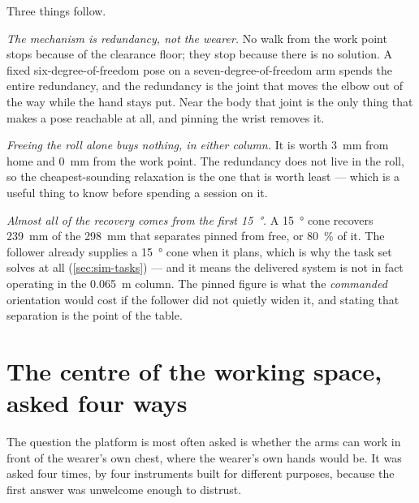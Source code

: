 Three things follow.

\emph{The mechanism is redundancy, not the wearer.} No walk from the work
point stops because of the clearance floor; they stop because there is no
solution. A fixed six-degree-of-freedom pose on a seven-degree-of-freedom arm
spends the entire redundancy, and the redundancy is the joint that moves the
elbow out of the way while the hand stays put. Near the body that joint is the
only thing that makes a pose reachable at all, and pinning the wrist removes
it.

\emph{Freeing the roll alone buys nothing, in either column.} It is worth
\SI{3}{\milli\metre} from home and \SI{0}{\milli\metre} from the work point.
The redundancy does not live in the roll, so the cheapest-sounding relaxation
is the one that is worth least --- which is a useful thing to know before
spending a session on it.

\emph{Almost all of the recovery comes from the first \SI{15}{\degree}.} A
\SI{15}{\degree} cone recovers \SI{239}{\milli\metre} of the
\SI{298}{\milli\metre} that separates pinned from free, or
\SI{80}{\percent} of it. The follower already supplies a \SI{15}{\degree}
cone when it plans, which is why the task set solves at all
(\cref{sec:sim-tasks}) --- and it means the delivered system is not in fact
operating in the \SI{0.065}{\metre} column. The pinned figure is what the
\emph{commanded} orientation would cost if the follower did not quietly widen
it, and stating that separation is the point of the table.

\section{The centre of the working space, asked four ways}
\label{sec:centre}

The question the platform is most often asked is whether the arms can work in
front of the wearer's own chest, where the wearer's own hands would be. It was
asked four times, by four instruments built for different purposes, because
the first answer was unwelcome enough to distrust.

